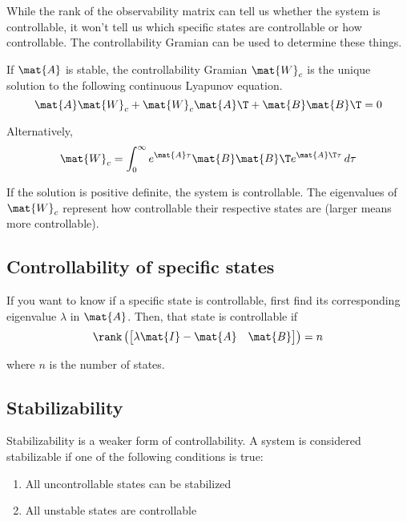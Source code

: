 While the rank of the observability matrix can tell us whether the system is
controllable, it won't tell us which specific states are controllable or how
controllable. The controllability Gramian can be used to determine these things.

If $\mat{A}$ is stable, the controllability Gramian $\mat{W}_c$ is the unique
solution to the following continuous Lyapunov equation.
\begin{equation}
  \mat{A}\mat{W}_c + \mat{W}_c\mat{A}\T + \mat{B}\mat{B}\T = 0
\end{equation}

Alternatively,
\begin{equation}
  \mat{W}_c =
    \int_0^\infty e^{\mat{A}\tau} \mat{B}\mat{B}\T e^{\mat{A}\T\tau} \,d\tau
\end{equation}

If the solution is positive definite, the system is controllable. The
eigenvalues of $\mat{W}_c$ represent how controllable their respective states
are (larger means more controllable).

\subsection{Controllability of specific states}

If you want to know if a specific state is controllable, first find its
corresponding eigenvalue $\lambda$ in $\mat{A}$. Then, that state is
controllable if
\begin{equation}
  \rank\left(
  \begin{bmatrix}
    \lambda\mat{I} - \mat{A} & \mat{B}
  \end{bmatrix}\right) = n
\end{equation}

where $n$ is the number of \glspl{state}.

\subsection{Stabilizability}

Stabilizability is a weaker form of controllability. A system is considered
stabilizable if one of the following conditions is true:
\begin{enumerate}
  \item All uncontrollable states can be stabilized
  \item All unstable states are controllable
\end{enumerate}

